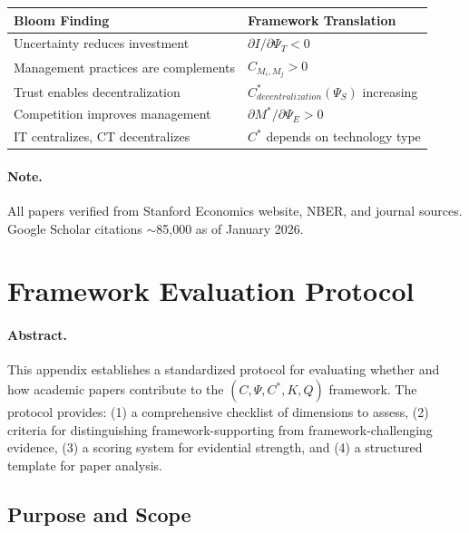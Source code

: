 \documentclass[12pt,a4paper]{article}
\begin{document}
\begin{center}
\renewcommand{\arraystretch}{1.3}
\begin{tabular}{ll}
\hline
\textbf{Bloom Finding} & \textbf{Framework Translation} \\
\hline
Uncertainty reduces investment & $\partial I / \partial \Psi_T < 0$ \\
Management practices are complements & $C_{M_i, M_j} > 0$ \\
Trust enables decentralization & $C^*_{decentralization}(\Psi_S)$ increasing \\
Competition improves management & $\partial M^* / \partial \Psi_E > 0$ \\
IT centralizes, CT decentralizes & $C^*$ depends on technology type \\
\hline
\end{tabular}
\end{center}

\paragraph{Note.}
All papers verified from Stanford Economics website, NBER, and journal sources.
Google Scholar citations $\sim$85,000 as of January 2026.

\section{Framework Evaluation Protocol}
\label{app:evaluationprotocol}

\paragraph{Abstract.}
This appendix establishes a standardized protocol for evaluating whether and
how academic papers contribute to the $(C, \Psi, C^*, K, Q)$ framework. The protocol 
provides: (1) a comprehensive checklist of dimensions to assess, (2) criteria
for distinguishing framework-supporting from framework-challenging evidence, (3)
a scoring system for evidential strength, and (4) a structured template for paper
analysis.

\subsection{Purpose and Scope}
\end{document}
